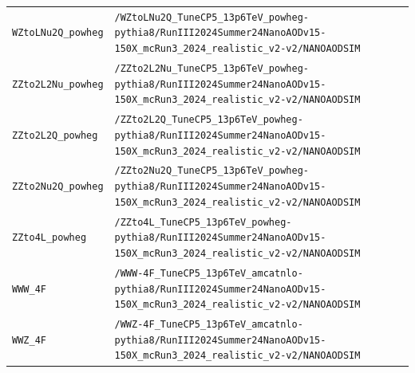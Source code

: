 \begin{longtable}{@{}>{\RaggedRight\arraybackslash}p{} >{\RaggedRight\arraybackslash}p{}@{}}
\addlinespace[2pt]
\texttt{WZtoLNu2Q\_\allowbreak{}powheg} & \texttt{/\allowbreak{}WZtoLNu2Q\_\allowbreak{}TuneCP5\_\allowbreak{}13p6TeV\_\allowbreak{}powheg-\allowbreak{}pythia8/\allowbreak{}RunIII2024Summer24NanoAODv15-\allowbreak{}150X\_\allowbreak{}mcRun3\_\allowbreak{}2024\_\allowbreak{}realistic\_\allowbreak{}v2-\allowbreak{}v2/\allowbreak{}NANOAODSIM} \\
\addlinespace[2pt]
\texttt{ZZto2L2Nu\_\allowbreak{}powheg} & \texttt{/\allowbreak{}ZZto2L2Nu\_\allowbreak{}TuneCP5\_\allowbreak{}13p6TeV\_\allowbreak{}powheg-\allowbreak{}pythia8/\allowbreak{}RunIII2024Summer24NanoAODv15-\allowbreak{}150X\_\allowbreak{}mcRun3\_\allowbreak{}2024\_\allowbreak{}realistic\_\allowbreak{}v2-\allowbreak{}v2/\allowbreak{}NANOAODSIM} \\
\addlinespace[2pt]
\texttt{ZZto2L2Q\_\allowbreak{}powheg} & \texttt{/\allowbreak{}ZZto2L2Q\_\allowbreak{}TuneCP5\_\allowbreak{}13p6TeV\_\allowbreak{}powheg-\allowbreak{}pythia8/\allowbreak{}RunIII2024Summer24NanoAODv15-\allowbreak{}150X\_\allowbreak{}mcRun3\_\allowbreak{}2024\_\allowbreak{}realistic\_\allowbreak{}v2-\allowbreak{}v2/\allowbreak{}NANOAODSIM} \\
\addlinespace[2pt]
\texttt{ZZto2Nu2Q\_\allowbreak{}powheg} & \texttt{/\allowbreak{}ZZto2Nu2Q\_\allowbreak{}TuneCP5\_\allowbreak{}13p6TeV\_\allowbreak{}powheg-\allowbreak{}pythia8/\allowbreak{}RunIII2024Summer24NanoAODv15-\allowbreak{}150X\_\allowbreak{}mcRun3\_\allowbreak{}2024\_\allowbreak{}realistic\_\allowbreak{}v2-\allowbreak{}v2/\allowbreak{}NANOAODSIM} \\
\addlinespace[2pt]
\texttt{ZZto4L\_\allowbreak{}powheg} & \texttt{/\allowbreak{}ZZto4L\_\allowbreak{}TuneCP5\_\allowbreak{}13p6TeV\_\allowbreak{}powheg-\allowbreak{}pythia8/\allowbreak{}RunIII2024Summer24NanoAODv15-\allowbreak{}150X\_\allowbreak{}mcRun3\_\allowbreak{}2024\_\allowbreak{}realistic\_\allowbreak{}v2-\allowbreak{}v2/\allowbreak{}NANOAODSIM} \\
\addlinespace[2pt]
\texttt{WWW\_\allowbreak{}4F} & \texttt{/\allowbreak{}WWW-\allowbreak{}4F\_\allowbreak{}TuneCP5\_\allowbreak{}13p6TeV\_\allowbreak{}amcatnlo-\allowbreak{}pythia8/\allowbreak{}RunIII2024Summer24NanoAODv15-\allowbreak{}150X\_\allowbreak{}mcRun3\_\allowbreak{}2024\_\allowbreak{}realistic\_\allowbreak{}v2-\allowbreak{}v2/\allowbreak{}NANOAODSIM} \\
\addlinespace[2pt]
\texttt{WWZ\_\allowbreak{}4F} & \texttt{/\allowbreak{}WWZ-\allowbreak{}4F\_\allowbreak{}TuneCP5\_\allowbreak{}13p6TeV\_\allowbreak{}amcatnlo-\allowbreak{}pythia8/\allowbreak{}RunIII2024Summer24NanoAODv15-\allowbreak{}150X\_\allowbreak{}mcRun3\_\allowbreak{}2024\_\allowbreak{}realistic\_\allowbreak{}v2-\allowbreak{}v2/\allowbreak{}NANOAODSIM} \\

\end{longtable}

